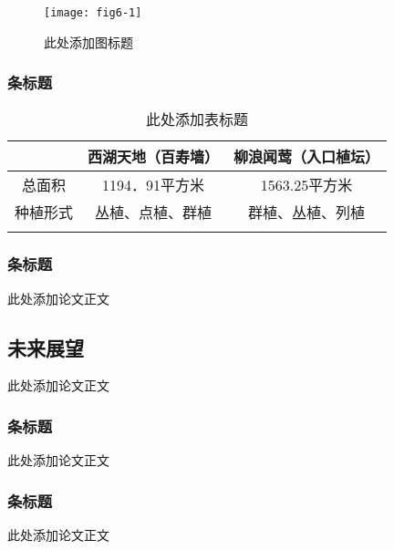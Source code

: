 \documentclass{article}
\begin{document}
\begin{figure}[H]
\centering
\texttt{[image: fig6-1]}
\caption{此处添加图标题}\label{fig6-1}
\end{figure}

\subsubsection{条标题}

\begin{table}[H]
\centering
\caption{此处添加表标题}\label{tab1-1}
\begin{tabular}{!{\vrule width1.2pt}c|c|c!{\vrule width1.2pt}}
\Xhline{1.2pt}
 & 西湖天地（百寿墙） & 柳浪闻莺（入口植坛）\\ \hline
总面积 & 1194．91平方米 & 1563.25平方米\\ \hline
种植形式 & 丛植、点植、群植  & 群植、丛植、列植\\ \Xhline{1.2pt}
\end{tabular}
\end{table}


\subsubsection{条标题}
此处添加论文正文


\subsection{未来展望}
此处添加论文正文

\subsubsection{条标题}
此处添加论文正文

\subsubsection{条标题}
此处添加论文正文






\end{document}
